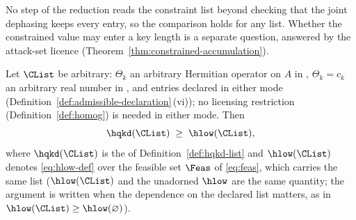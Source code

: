 
No step of the reduction reads the constraint list beyond checking that the
joint dephasing keeps every entry, so the comparison holds for any list.
Whether the constrained value may enter a key length is a separate question,
answered by the attack-set licence (Theorem~\ref{thm:constrained-accumulation}).

\begin{corollary}\label{cor:reduction-constrained}
Let $\CList$ be arbitrary: $\Theta_k$ an arbitrary Hermitian operator on $A$
in , $\Theta_k=c_k$ an arbitrary real number in
, and entries declared  in
either mode (Definition~\ref{def:admissible-declaration}\,(vi)); no licensing restriction
(Definition~\ref{def:homog}) is needed in either mode. Then
\begin{equation}\label{eq:c8-general}
  \hqkd(\CList)\;\ge\;\hlow(\CList),
\end{equation}
where $\hqkd(\CList)$ is the  of
Definition~\ref{def:hqkd-list} and $\hlow(\CList)$ denotes
\eqref{eq:hlow-def} over the feasible set $\Feas$ of \eqref{eq:feas},
which carries the same list ($\hlow(\CList)$ and the unadorned
$\hlow$ are the same quantity; the argument is written when the
dependence on the declared list matters, as in
$\hlow(\CList)\ge\hlow(\varnothing)$).
\end{corollary}

